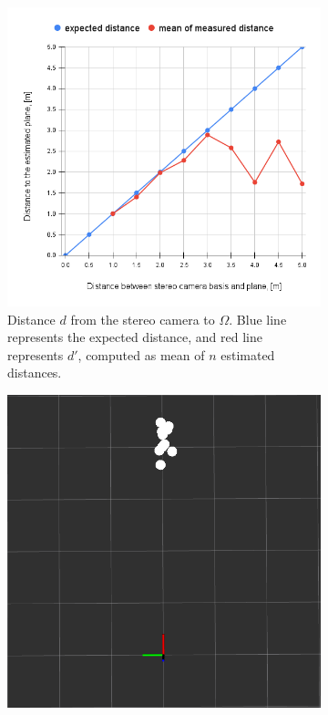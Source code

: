 \begin{figure}[ht]
  \begin{subfigure}[ht]{0.49\textwidth}
    \centering
    \includegraphics[width=\textwidth]{graphics/experiment_1_chart_planedist.png}
    \caption[Distance to the estimated plane]{Distance $d$ from the stereo camera to $\Omega$.
    Blue line represents the expected distance, and red line represents $d'$, computed as mean of $n$ estimated distances.}
    \label{fig:exp_1_chart_dists}
  \end{subfigure}
  \hfill
  \begin{subfigure}[ht]{0.49\textwidth}
    \centering
    \includegraphics[width=\textwidth]{graphics/experiment_1_4m.png}

\end{subfigure}
\end{figure}
